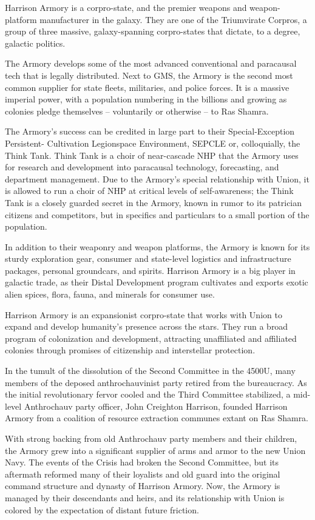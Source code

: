Harrison Armory is a corpro-state, and the premier weapons and weapon-platform manufacturer
in the galaxy. They are one of the Triumvirate Corpros, a group of three massive, galaxy-spanning
corpro-states that dictate, to a degree, galactic politics.

The Armory develops some of the most advanced conventional and paracausal tech that is legally
distributed. Next to GMS, the Armory is the second most common supplier for state fleets,
militaries, and police forces. It is a massive imperial power, with a population numbering in the
billions and growing as colonies pledge themselves -- voluntarily or otherwise -- to Ras Shamra.

The Armory’s success can be credited in large part to their Special-Exception Persistent-
Cultivation Legionspace Environment, SEPCLE or, colloquially, the Think Tank. Think Tank is a
choir of near-cascade NHP that the Armory uses for research and development into paracausal
technology, forecasting, and department management. Due to the Armory’s special relationship
with Union, it is allowed to run a choir of NHP at critical levels of self-awareness; the Think Tank is
a closely guarded secret in the Armory, known in rumor to its patrician citizens and competitors,
but in specifics and particulars to a small portion of the population.

In addition to their weaponry and weapon platforms, the Armory is known for its sturdy exploration
gear, consumer and state-level logistics and infrastructure packages, personal groundcars, and
spirits. Harrison Armory is a big player in galactic trade, as their Distal Development program
cultivates and exports exotic alien spices, flora, fauna, and minerals for consumer use.

Harrison Armory is an expansionist corpro-state that works with Union to expand and develop
humanity’s presence across the stars. They run a broad program of colonization and
development, attracting unaffiliated and affiliated colonies through promises of citizenship and
interstellar protection.

In the tumult of the dissolution of the Second Committee in the 4500U, many members of the
deposed anthrochauvinist party retired from the bureaucracy. As the initial revolutionary fervor
cooled and the Third Committee stabilized, a mid-level Anthrochauv party officer, John Creighton
Harrison, founded Harrison Armory from a coalition of resource extraction communes extant on
Ras Shamra.

With strong backing from old Anthrochauv party members and their children, the Armory grew
into a significant supplier of arms and armor to the new Union Navy. The events of the Crisis had
broken the Second Committee, but its aftermath reformed many of their loyalists and old guard
into the original command structure and dynasty of Harrison Armory. Now, the Armory is
managed by their descendants and heirs, and its relationship with Union is colored by the
expectation of distant future friction.

